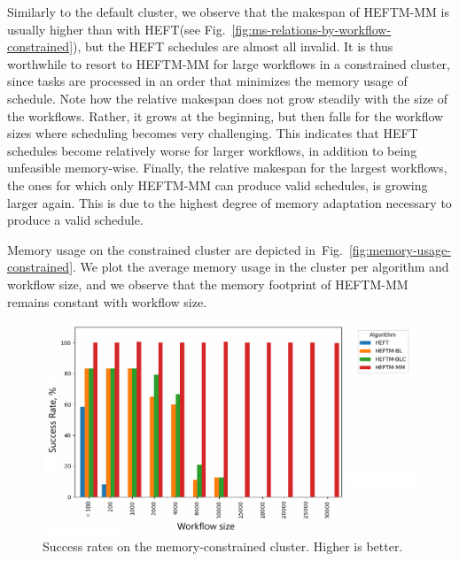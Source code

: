 \documentclass[conference]{IEEEtran}
\newcommand{\algo}[1]{\textsc{#1}}
\newcommand{\heft}{\algo{HEFT}\xspace}
\newcommand{\heftmm}{\algo{HEFTM-MM}\xspace}
\newcommand{\new}[1]{{#1}}
\begin{document}
Similarly to the default cluster, we observe that the makespan of \heftmm is usually higher
than with \heft (see Fig.~\ref{fig:ms-relations-by-workflow-constrained}), but the \heft schedules are
almost all invalid. It is thus worthwhile to resort to \heftmm for large workflows
in a constrained cluster, since tasks are processed in an order that minimizes
the memory usage of schedule.
\new{Note how the relative makespan does not grow steadily with the size of the workflows.
Rather, it grows at the beginning, but then falls for the workflow sizes where scheduling becomes very challenging.
This indicates that \heft schedules become relatively worse for larger workflows, in addition to being unfeasible memory-wise.
Finally, the relative makespan for the largest workflows, the ones for which only \heftmm can produce valid schedules,
is growing larger again.
This is due to the highest degree of memory adaptation necessary to produce a valid schedule.
}


%
%
%

Memory usage on the constrained cluster are depicted in~Fig.~\ref{fig:memory-usage-constrained}.
\new{We plot the average memory usage in the cluster per algorithm and workflow size},
and we observe that the memory footprint of \heftmm remains constant with workflow size.


\begin{figure}[tb]
    \centering
    \includegraphics[width=1\columnwidth] {images/success-rates-tiny}
    \caption{Success rates on the memory-constrained cluster. Higher is better. }
    \label{fig:success-rates-tiny}
\end{figure}
\end{document}
